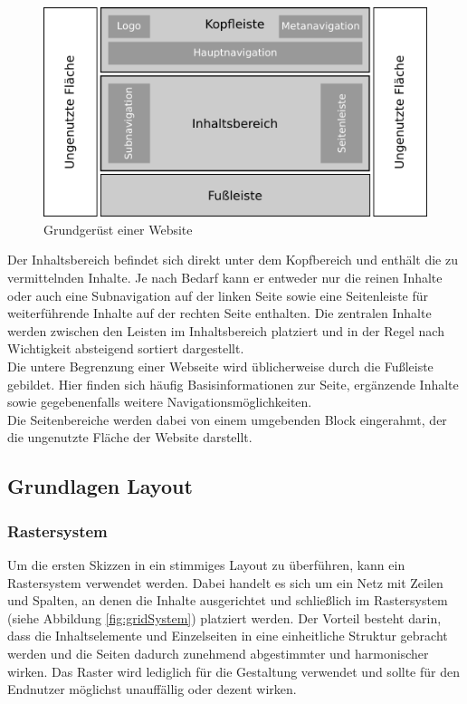 \begin{figure}[!htb]
    \centering
    \includegraphics[scale=0.8]{figures/jan/Wire_Areas.png}
    \caption[Grundgerüst einer Website]{Grundgerüst einer Website}
    \label{fig:Grundgeruest}
\end{figure}

Der Inhaltsbereich befindet sich direkt unter dem Kopfbereich und enthält die zu vermittelnden Inhalte. Je nach Bedarf kann er entweder nur die reinen Inhalte oder auch eine Subnavigation auf der linken Seite sowie eine Seitenleiste für weiterführende Inhalte auf der rechten Seite enthalten. Die zentralen Inhalte werden zwischen den Leisten im Inhaltsbereich platziert und in der Regel nach Wichtigkeit absteigend sortiert dargestellt. \\
Die untere Begrenzung einer Webseite wird üblicherweise durch die Fußleiste gebildet. Hier finden sich häufig Basisinformationen zur Seite, ergänzende Inhalte sowie gegebenenfalls weitere Navigationsmöglichkeiten. \\
Die Seitenbereiche werden dabei von einem umgebenden Block eingerahmt, der die ungenutzte Fläche der Website darstellt.

\subsection{Grundlagen Layout}
\label{sec:layout}

\subsubsection{Rastersystem}

Um die ersten Skizzen in ein stimmiges Layout zu überführen, kann ein Rastersystem verwendet werden. Dabei handelt es sich um ein Netz mit Zeilen und Spalten, an denen die Inhalte ausgerichtet und schließlich im Rastersystem (siehe Abbildung \ref{fig:gridSystem}) platziert werden. Der Vorteil besteht darin, dass die Inhaltselemente und Einzelseiten in eine einheitliche Struktur gebracht werden und die Seiten dadurch zunehmend abgestimmter und harmonischer wirken. Das Raster wird lediglich für die Gestaltung verwendet und sollte für den Endnutzer möglichst unauffällig oder dezent wirken.

